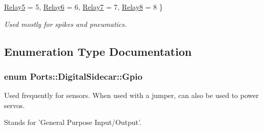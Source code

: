 \begin{DoxyCompactItemize}
\*
\hyperlink{namespace_ports_1_1_digital_sidecar_aeab30541e546fd2a5f52a357e04e8787a923849e13262b01f6f7cc0abed32a340}{\-Relay5} =  5, 
\hyperlink{namespace_ports_1_1_digital_sidecar_aeab30541e546fd2a5f52a357e04e8787a0f9cd47d59a1876e13aedbc7d62cedfb}{\-Relay6} =  6, 
\hyperlink{namespace_ports_1_1_digital_sidecar_aeab30541e546fd2a5f52a357e04e8787a705b1b9a6dc0722d417e2638f6cbd2df}{\-Relay7} =  7, 
\hyperlink{namespace_ports_1_1_digital_sidecar_aeab30541e546fd2a5f52a357e04e8787ade1a2d3370eb284dbb49af176a2f11c1}{\-Relay8} =  8
 \}
\begin{DoxyCompactList}\small\item\em \-Used mostly for spikes and pneumatics. \end{DoxyCompactList}\end{DoxyCompactItemize}


\subsection{\-Enumeration \-Type \-Documentation}
\hypertarget{namespace_ports_1_1_digital_sidecar_a6c49b2f110f8b96c73858cfa03488c8c}{
\subsubsection[{\-Gpio}]{\setlength{\rightskip}{0pt plus 5cm}enum {\bf \-Ports\-::\-Digital\-Sidecar\-::\-Gpio}}}\label{namespace_ports_1_1_digital_sidecar_a6c49b2f110f8b96c73858cfa03488c8c}


\-Used frequently for sensors. \-When used with a jumper, can also be used to power servos. 

\-Stands for '\-General \-Purpose \-Input/\-Output'.

